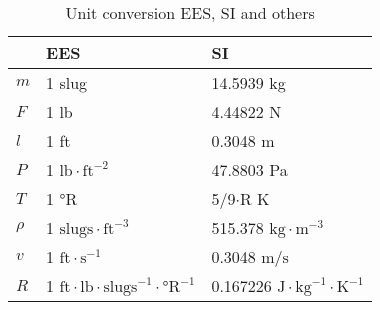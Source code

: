 \documentclass[10pt, twocolumn]{article}
\begin{document}
\begin{table}[ht] %
  \caption{Unit conversion EES, SI and others}
  \begin{center}
    \centering %
    \begin{tabular}{ %
        l|l|l
      }

               & EES                                                                                & SI                                                                   \\ \hline\hline
      \(m\)    & 1 slug                                                                             & 14.5939 kg                                                           \\ \hline
      \(F\)    & 1 lb                                                                               & 4.44822 N                                                            \\ \hline
      \(l\)    & 1 ft                                                                               & 0.3048 m                                                             \\ \hline
      \(P\)    & 1 \(\mathrm{lb} \cdot \mathrm{ft}^{-2}\)                                           & 47.8803 Pa                                                           \\ \hline
      \(T\)    & 1 °R                                                                               & 5/9\(\cdot\)R K                                                      \\ \hline
      \(\rho\) & 1 \(\mathrm{slugs} \cdot \mathrm{ft}^{-3}\)                                        & 515.378 \(\mathrm{kg} \cdot \mathrm{m}^{-3}\)                        \\ \hline
      \(v\)    & 1 \(\mathrm{ft} \cdot \mathrm{s}^{-1}\)                                            & 0.3048 \(\si{\metre\per\second}\)                                    \\ \hline
      \(R\)    & 1 \(\mathrm{ft} \cdot \mathrm{lb} \cdot \mathrm{slugs}^{-1} \cdot \text{°R}^{-1}\) & 0.167226 \(\mathrm{J} \cdot \mathrm{kg}^{-1} \cdot \mathrm{K}^{-1}\) \\

\end{tabular}
\end{center}
\end{table}
\end{document}
